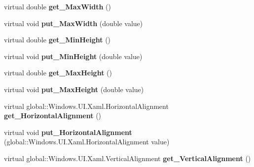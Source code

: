 \begin{DoxyCompactItemize}
virtual double {\bfseries get\+\_\+\+Max\+Width} ()
\item 
\mbox{\label{class_windows_1_1_u_i_1_1_xaml_1_1_framework_element_ada37511a7c593957ca7b0381963044f4}} 
virtual void {\bfseries put\+\_\+\+Max\+Width} (double value)
\item 
\mbox{\label{class_windows_1_1_u_i_1_1_xaml_1_1_framework_element_a52222d5267610a2a346df4f6d5a66b9c}} 
virtual double {\bfseries get\+\_\+\+Min\+Height} ()
\item 
\mbox{\label{class_windows_1_1_u_i_1_1_xaml_1_1_framework_element_a1298543873a807c31d87c0ff83248b89}} 
virtual void {\bfseries put\+\_\+\+Min\+Height} (double value)
\item 
\mbox{\label{class_windows_1_1_u_i_1_1_xaml_1_1_framework_element_acc5b7c0d438cd20d399dea14edd2983a}} 
virtual double {\bfseries get\+\_\+\+Max\+Height} ()
\item 
\mbox{\label{class_windows_1_1_u_i_1_1_xaml_1_1_framework_element_ae1670c631585c95315bf11dbfca78d7b}} 
virtual void {\bfseries put\+\_\+\+Max\+Height} (double value)
\item 
\mbox{\label{class_windows_1_1_u_i_1_1_xaml_1_1_framework_element_a194e28f5181a35d09b2dd21f497fe3d1}} 
virtual global\+::\+Windows.\+U\+I.\+Xaml.\+Horizontal\+Alignment {\bfseries get\+\_\+\+Horizontal\+Alignment} ()
\item 
\mbox{\label{class_windows_1_1_u_i_1_1_xaml_1_1_framework_element_a7001e4c656cec6442ed23dc39bcdf7e4}} 
virtual void {\bfseries put\+\_\+\+Horizontal\+Alignment} (global\+::\+Windows.\+U\+I.\+Xaml.\+Horizontal\+Alignment value)
\item 
\mbox{\label{class_windows_1_1_u_i_1_1_xaml_1_1_framework_element_acfc460d0c6c8e311fe72b9ec4e4a167f}} 
virtual global\+::\+Windows.\+U\+I.\+Xaml.\+Vertical\+Alignment {\bfseries get\+\_\+\+Vertical\+Alignment} ()

\end{DoxyCompactItemize}
